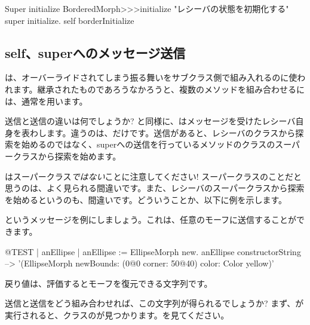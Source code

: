 \documentclass[a4paper,10pt,twoside]{book}
\begin{document}

\begin{method}[morphinit]{Super initialize}
BorderedMorph>>>initialize
	"レシーバの状態を初期化する"
	super initialize.
	self borderInitialize
\end{method}


\subsection{self、superへのメッセージ送信}

\super{}は、オーバーライドされてしまう振る舞いをサブクラス側で組み入れるのに使われます。継承されたものであろうなかろうと、複数のメソッドを組み合わせるには、通常\self{}を用います。

\self 送信と\super 送信の違いは何でしょうか? \self と同様に、\super はメッセージを受けたレシーバ自身を表わします。違うのは、だけです。\super 送信があると、レシーバのクラスから探索を始めるのではなく、superへの送信を行っているメソッドのクラスのスーパークラスから探索を始めます。

\super はスーパークラス\emph{ではない}ことに注意してください! スーパークラスのことだと思うのは、よく見られる間違いです。また、レシーバのスーパークラスから探索を始めるというのも、間違いです。どういうことか、以下に例を示します。

というメッセージを例にしましょう。これは、任意のモーフに送信することができます。
\begin{code}{@TEST | anEllipse | anEllipse := EllipseMorph new.}
anEllipse constructorString --> '(EllipseMorph newBounds: (0@0 corner: 50@40) color: Color yellow)'
\end{code}
戻り値は、評価するとモーフを復元できる文字列です。

\self 送信と\super 送信をどう組み合わせれば、この文字列が得られるでしょうか? まず、が実行されると、クラスのが見つかります。を見てください。
\end{document}
